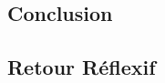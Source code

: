 \documentclass{article}
\begin{document}
\subsection{Conclusion}

\subsection{Retour Réflexif}




\end{document}
